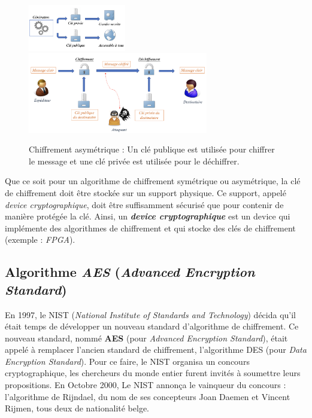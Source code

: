 \documentclass[10pt, oneside, a4paper]{article}
\begin{document}
\begin{figure}[htbp]
    \centering
    \includegraphics[width=0.38\textwidth]{image/cle_asymetrique}
    \includegraphics[width=0.7\textwidth]{image/asymetrique}
    \caption{Chiffrement asymétrique : Un clé publique est utilisée pour chiffrer le message et une clé privée est utilisée pour le déchiffrer.}
    \label{fig:asymétrique}
\end{figure}


Que ce soit pour un algorithme de chiffrement symétrique ou asymétrique, la clé de chiffrement doit être stockée sur un support physique. Ce support, appelé \textit{device cryptographique}, doit être suffisamment sécurisé que pour contenir de manière protégée la clé. Ainsi, un \textbf{\textit{device cryptographique}} est un device qui implémente des algorithmes de chiffrement et qui stocke des clés de chiffrement (exemple : \textit{FPGA}).

\subsection{Algorithme \textit{AES} (\textit{Advanced Encryption Standard})}
\label{sec:AES}

En 1997, le NIST (\textit{National Institute of Standards and Technology}) décida qu'il était temps de développer un nouveau standard d'algorithme de chiffrement. Ce nouveau standard, nommé \textbf{AES} (pour \textit{Advanced Encryption Standard}), était appelé à remplacer l'ancien standard de chiffrement, l'algorithme DES (pour \textit{Data Encryption Standard}). Pour ce faire, le NIST organisa un concours cryptographique, les chercheurs du monde entier furent invités à soumettre leurs propositions. En Octobre 2000, Le NIST annonça le vainqueur du concours : l'algorithme de Rijndael, du nom de ses concepteurs Joan Daemen et Vincent Rijmen, tous deux de nationalité belge.
\end{document}

